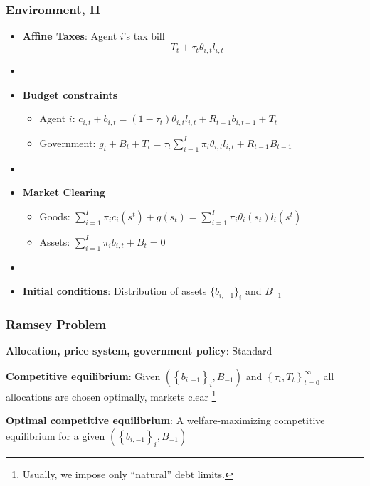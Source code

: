 \documentclass{beamer}
\begin{document}
\begin{frame}
 \frametitle{Environment, II}
 \begin{itemize}
  \item \textbf{Affine Taxes}: Agent $i$'s tax bill
\[- T_t + \tau_t \theta_{i,t}l_{i,t}\]

\item[]
  \item \textbf{Budget constraints}
  \begin{itemize}
   \item Agent $i$: $ c_{i,t}+b_{i,t}=\left( 1-\tau _{t}\right) \theta _{i,t}l_{i,t}+R_{t-1}b_{i,t-1}+T_{t}$
\item Government: $g_{t}+B_{t}+T_t=\tau _{t}\sum_{i=1}^{I}\pi _{i}\theta_{i,t}l_{i,t}+R_{t-1}B_{t-1}$
  \end{itemize}

\item[]
  \item \textbf{Market Clearing}
  \begin{itemize}
   \item Goods: $\sum_{i=1}^{I}\pi_{i}c_{i}(s^t)+g\left( s_{t}\right) =\sum_{i=1}^{I}\pi
_{i}\theta _{i}\left( s_{t}\right) l_{i}(s^t)$

   \item Assets: $\sum_{i=1}^{I}\pi _{i}b_{i,t}+B_{t}=0$

  \end{itemize}
  \item[]

\item \textbf{Initial conditions}: Distribution of assets $\{b_{i,-1}\}_i$ and $B_{-1}$
\end{itemize}
\end{frame}


\begin{frame}
 \frametitle{Ramsey Problem}

\begin{definition}
\textbf{Allocation, price system, government policy}: Standard

\end{definition}

\begin{definition}
\textbf{Competitive equilibrium}: Given $\left( \left\{ b_{i,-1}\right\}
_{i},B_{-1}\right) $ and $\left\{ \tau _{t},T_{t}\right\} _{t=0}^{\infty }$
all allocations are chosen optimally, markets clear \footnote{Usually, we impose only  ``natural'' debt limits. }
\end{definition}

\begin{definition}
\textbf{Optimal competitive equilibrium}: A welfare-maximizing competitive
equilibrium for a given $\left( \left\{ b_{i,-1}\right\} _{i},B_{-1}\right) $
\end{definition}

 \end{frame}
\end{document}
